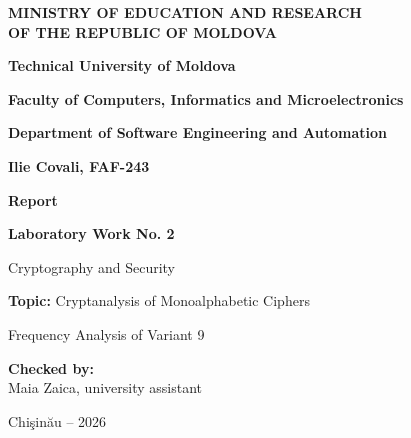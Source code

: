 \documentclass[12pt,a4paper]{article}
\begin{document}
\begin{titlepage}
    \centering
    {\bfseries\large MINISTRY OF EDUCATION AND RESEARCH\\
    OF THE REPUBLIC OF MOLDOVA\par}
    \vspace{0.4cm}
    {\bfseries Technical University of Moldova\par}
    \vspace{0.2cm}
    {\bfseries Faculty of Computers, Informatics and Microelectronics\par}
    \vspace{0.2cm}
    {\bfseries Department of Software Engineering and Automation\par}
    
    \vspace{3.5cm}
    
    {\Large\bfseries Ilie Covali, FAF-243\par}
    
    \vspace{1.5cm}
    
    {\huge\bfseries Report\par}
    \vspace{0.3cm}
    {\Large\bfseries Laboratory Work No. 2\par}
    \vspace{0.2cm}
    {\large Cryptography and Security\par}
    \vspace{0.4cm}
    {\large\textbf{Topic:} Cryptanalysis of Monoalphabetic Ciphers\par}
    \vspace{0.2cm}
    {\large Frequency Analysis of Variant 9\par}
    
    \vfill
    
    \begin{flushleft}
    \large
    \textbf{Checked by:}\\
    Maia Zaica, university assistant
    \end{flushleft}
    
    \vspace{1cm}
    
    {\large Chi\c{s}in\u{a}u -- 2026\par}
\end{titlepage}
\end{document}
